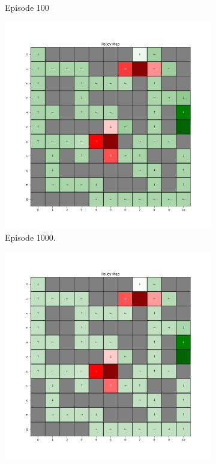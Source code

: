 \documentclass{assignment}
\begin{document}
\begin{figure}[H]
\begin{subfigure}{0.3\textwidth}
    \caption{Episode 100}
    \end{subfigure}
    \begin{subfigure}{0.3\textwidth}
        \includegraphics[width=\textwidth]{figures/policy_td/gamma_sweep/policy_alpha_0.1_gamma_0.25_epsilon_0.2_iteration_1000.png}
    \caption{Episode 1000.}
    \end{subfigure}\hfill
    \begin{subfigure}{0.3\textwidth}
        \includegraphics[width=\textwidth]{figures/policy_td/gamma_sweep/policy_alpha_0.1_gamma_0.25_epsilon_0.2_iteration_5000.png}

\end{subfigure}
\end{figure}
\end{document}

